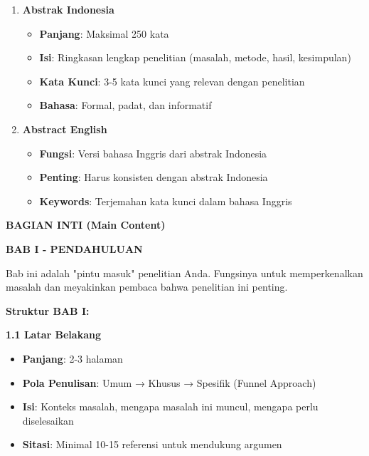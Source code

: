 \begin{enumerate}
    \item \textbf{Abstrak Indonesia}
    \begin{itemize}
        \item \textbf{Panjang}: Maksimal 250 kata
        \item \textbf{Isi}: Ringkasan lengkap penelitian (masalah, metode, hasil, kesimpulan)
        \item \textbf{Kata Kunci}: 3-5 kata kunci yang relevan dengan penelitian
        \item \textbf{Bahasa}: Formal, padat, dan informatif
    \end{itemize}

    \item \textbf{Abstract English}
    \begin{itemize}
        \item \textbf{Fungsi}: Versi bahasa Inggris dari abstrak Indonesia
        \item \textbf{Penting}: Harus konsisten dengan abstrak Indonesia
        \item \textbf{Keywords}: Terjemahan kata kunci dalam bahasa Inggris
    \end{itemize}
\end{enumerate}

\textbf{BAGIAN INTI (Main Content)}

\textbf{BAB I - PENDAHULUAN}

Bab ini adalah "pintu masuk" penelitian Anda. Fungsinya untuk memperkenalkan masalah dan meyakinkan pembaca bahwa penelitian ini penting.

\textbf{Struktur BAB I:}

\textbf{1.1 Latar Belakang}
\begin{itemize}
    \item \textbf{Panjang}: 2-3 halaman
    \item \textbf{Pola Penulisan}: Umum → Khusus → Spesifik (Funnel Approach)
    \item \textbf{Isi}: Konteks masalah, mengapa masalah ini muncul, mengapa perlu diselesaikan
    \item \textbf{Sitasi}: Minimal 10-15 referensi untuk mendukung argumen
\end{itemize}

